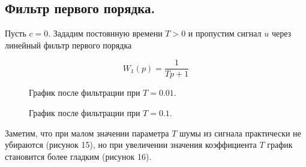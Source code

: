 \documentclass[a5paper, 10pt]{article}
\theoremstyle{definition}
\theoremstyle{plain}
\theoremstyle{remark}
\begin{document}
\newpage
\subsection{Фильтр первого порядка.}
Пусть $c= 0$. Зададим постоянную времени $T > 0$ и пропустим сигнал $u$ через линейный фильтр первого порядка

\begin{equation}
W_1 (p) = \frac{1}{Tp + 1}
\end{equation}



\begin{figure}[h!]
\caption{График после фильтрации при $T = 0.01$.}
\caption{График после фильтрации при $T = 0.1$.}
\end{figure}

Заметим, что при малом значении параметра $T$ шумы из сигнала практически не убираются (рисунок 15), но при увеличении значения коэффициента $T$ график становится более гладким (рисунок 16).\\
\end{document}
